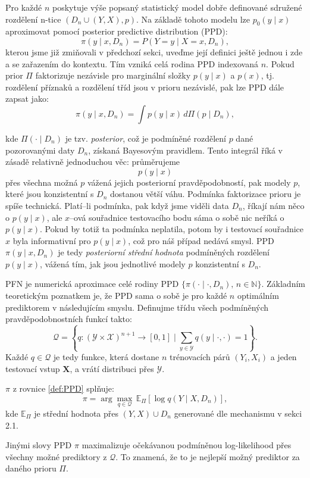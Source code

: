 Pro každé $n$ poskytuje výše popsaný statistický model dobře definované sdružené rozdělení n-tice $(D_n \cup (Y, X), p)$. 
Na základě tohoto modelu lze $p_0(y \mid x)$ aproximovat pomocí posterior predictive distribution (PPD):
$$\pi(y \mid x, D_n) = P(Y = y \mid X = x, D_n),$$
kterou jsme již zmiňovali v předchozí sekci, uveďme její definici ještě jednou i zde a se zařazením do kontextu.
Tím vzniká celá rodina PPD indexovaná $n$. 
Pokud prior $\Pi$ faktorizuje nezávisle pro marginální složky $p(y \mid x)$ a $p(x)$, tj. rozdělení příznaků a rozdělení tříd jsou v prioru nezávislé, pak lze PPD dále zapsat jako:
\begin{equation}
    \pi(y \mid x, D_n) = \int p(y \mid x) \, d\Pi(p \mid D_n),
\label{def:PPD}
\end{equation}

kde $\Pi(\cdot \mid D_n)$ je tzv. \textit{posterior}, což je podmíněné rozdělení $p$ dané pozorovanými daty $D_n$, získaná Bayesovým pravidlem. 
Tento integrál říká v zásadě relativně jednoduchou věc: průměrujeme $$p(y \mid x)$$ přes všechna možná $p$ vážená jejich posteriorní pravděpodobností, pak modely $p$, které jsou konzistentní s $D_n$ dostanou větší váhu.
Podmínka faktorizace prioru je spíše technická.
Platí–li podmínka, pak když jsme viděli data $D_n$, říkají nám něco o $p(y \mid x)$, ale $x$–ová souřadnice testovacího bodu sáma o sobě nic neříká o $p(y \mid x)$.
Pokud by totiž ta podmínka neplatila, potom by i testovací souřadnice $x$ byla informativní pro $p(y \mid x)$, což pro náš případ nedává smysl.
PPD $\pi(y \mid x, D_n)$ je tedy \textit{posteriorní střední hodnota} podmíněných rozdělení $p(y \mid x)$, vážená tím, jak jsou jednotlivé modely $p$ konzistentní s $D_n$.
\par   

PFN je numerická aproximace celé rodiny PPD $\{\pi(\cdot \mid \cdot, D_n),\, n \in \mathbb{N}\}$.
Základním teoretickým poznatkem je, že PPD sama o sobě je pro každé $n$ optimálním prediktorem v následujícím smyslu. 
Definujme třídu všech podmíněných pravděpodobnostních funkcí takto:
$$\mathcal{Q} = \left\{ q : (\mathcal{Y} \times \mathcal{X})^{n+1} \to [0,1] \;\Big|\; \sum_{y \in \mathcal{Y}} q(y \mid \cdot, \cdot) = 1 \right\}.$$
Každé $q \in \mathcal{Q}$ je tedy funkce, která dostane $n$ trénovacích párů $(Y_i, X_i)$ a jeden testovací vstup $\mathbf{X}$, a vrátí distribuci přes $\mathcal{Y}$.
\begin{theorem}
    $\pi$ z rovnice \ref{def:PPD} splňuje:
    \begin{equation}
            \pi = \arg\max_{q \in \mathcal{Q}} \, \mathbb{E}_\Pi[\log q(Y \mid X, D_n)],
    \end{equation}
    kde $\mathbb{E}_\Pi$ je střední hodnota přes $(Y, X) \cup D_n$ generované dle mechanismu v sekci 2.1.
\label{theorem:prior_je_max}
\end{theorem}
Jinými slovy PPD $\pi$ maximalizuje očekávanou podmíněnou log-likelihood přes všechny možné prediktory z $\mathcal{Q}$. 
To znamená, že to je nejlepší možný prediktor za daného prioru $\Pi$.

